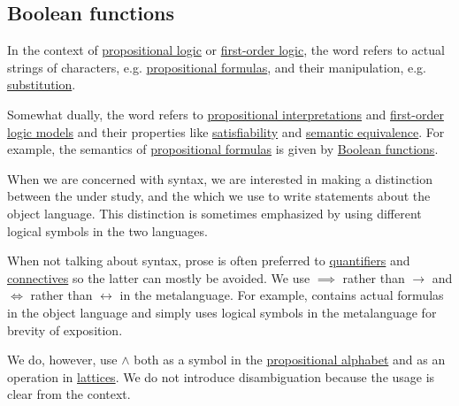 \subsection{Boolean functions}\label{subsec:boolean_functions}

\begin{remark}\label{rem:metalanguage_syntax_and_semantics}
  In the context of \hyperref[subsec:propositional_logic]{propositional logic} or \hyperref[subsec:first_order_logic]{first-order logic}, the word  refers to actual strings of characters, e.g. \hyperref[def:propositional_language]{propositional formulas}, and their manipulation, e.g. \hyperref[def:propositional_substitution]{substitution}.

  Somewhat dually, the word  refers to \hyperref[def:propositional_interpretation]{propositional interpretations} and \hyperref[def:first_order_model]{first-order logic models} and their properties like \hyperref[def:propositional_model/satisfiability]{satisfiability} and \hyperref[def:propositional_model/equivalence]{semantic equivalence}. For example, the semantics of \hyperref[def:propositional_language]{propositional formulas} is given by \hyperref[def:boolean_function]{Boolean functions}.

  When we are concerned with syntax, we are interested in making a distinction between the  under study, and the  which we use to write statements about the object language. This distinction is sometimes emphasized by using different logical symbols in the two languages.

  When not talking about syntax, prose is often preferred to \hyperref[def:first_order_logic_alphabet/quantifiers]{quantifiers} and \hyperref[def:propositional_alphabet/connectives]{connectives} so the latter can mostly be avoided. We use \( \implies \) rather than \( \rightarrow \) and \( \iff \) rather than \( \leftrightarrow \) in the metalanguage. For example,  contains actual formulas in the object language and  simply uses logical symbols in the metalanguage for brevity of exposition.

  We do, however, use \( \wedge \) both as a symbol in the \hyperref[def:propositional_alphabet]{propositional alphabet} and as an operation in \hyperref[def:binary_lattice_operations/meet]{lattices}. We do not introduce disambiguation because the usage is clear from the context.


\end{remark}
